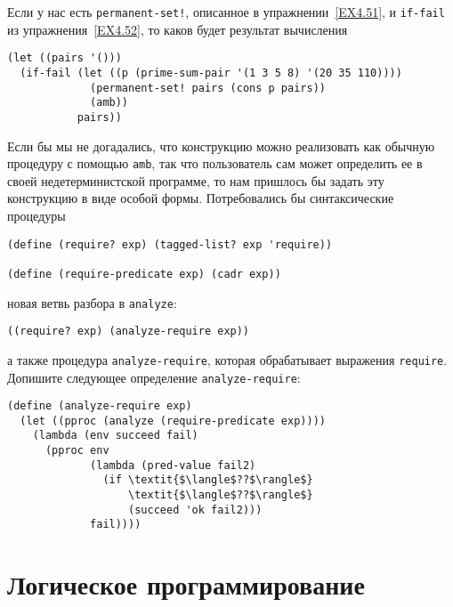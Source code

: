 \begin{exercise}{4.53}%
\label{EX4.53}%
Если у нас есть {\tt permanent-set!}, описанное в 
упражнении~\ref{EX4.51}, и {\tt if-fail} из
упражнения~\ref{EX4.52}, то каков будет результат вычисления

\begin{Verbatim}[fontsize=\small]
(let ((pairs '()))
  (if-fail (let ((p (prime-sum-pair '(1 3 5 8) '(20 35 110))))
             (permanent-set! pairs (cons p pairs))
             (amb))
           pairs))
\end{Verbatim}
\end{exercise}

\begin{exercise}{4.54}%
\label{EX4.54}%
Если бы мы не догадались, что конструкцию
можно реализовать как обычную процедуру с помощью {\tt amb},
так что пользователь сам может определить ее в своей недетерминистской
программе, то нам пришлось бы задать эту конструкцию в виде особой
формы.  Потребовались бы синтаксические процедуры

\begin{Verbatim}[fontsize=\small]
(define (require? exp) (tagged-list? exp 'require))

(define (require-predicate exp) (cadr exp))
\end{Verbatim}
новая ветвь разбора в {\tt analyze}:

\begin{Verbatim}[fontsize=\small]
((require? exp) (analyze-require exp))
\end{Verbatim}
а также процедура {\tt analyze-require}, которая обрабатывает
выражения {\tt require}.  Допишите следующее определение
{\tt analyze-require}:

\begin{Verbatim}[fontsize=\small]
(define (analyze-require exp)
  (let ((pproc (analyze (require-predicate exp))))
    (lambda (env succeed fail)
      (pproc env
             (lambda (pred-value fail2)
               (if \textit{$\langle$??$\rangle$}
                   \textit{$\langle$??$\rangle$}
                   (succeed 'ok fail2)))
             fail))))
\end{Verbatim}
\end{exercise}

\section{Логическое программирование}
\label{LOGIC-PROGRAMMING}%

